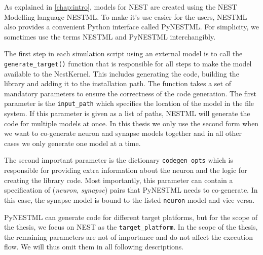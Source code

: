 As explained in \autoref{chap:intro}, models for NEST are created using the NEST Modelling language NESTML. To make it's use easier for the users, NESTML also provides a convenient Python interface called PyNESTML. For simplicity, we sometimes use the terms NESTML and PyNESTML interchangibly.

The first step in each simulation script using an external model is to call the \texttt{generate\_target()} function that is responsible for all steps to make the model available to the NestKernel. This includes generating the code, building the library and adding it to the installation path. The function takes a set of mandatory parameters to ensure the correctness of the code generation. The first parameter is the \texttt{input\_path} which specifies the location of the model in the file system. If this parameter is given as a list of paths, NESTML will generate the code for multiple models at once. In this thesis we only use the second form when we want to co-generate neuron and synapse models together and in all other cases we only generate one model at a time.

The second important parameter is the dictionary \texttt{codegen\_opts} which is responsible for providing extra information about the neuron and the logic for creating the library code. Most importantly, this parameter can contain a specification of (\emph{neuron}, \emph{synapse}) pairs that PyNESTML needs to co-generate. In this case, the synapse model is bound to the listed \texttt{neuron} model and vice versa.

PyNESTML can generate code for different target platforms, but for the scope of the thesis, we focus on NEST as the \texttt{target\_platform}. In the scope of the thesis, the remaining parameters are not of importance and do not affect the execution flow. We will thus omit them in all following descriptions.

